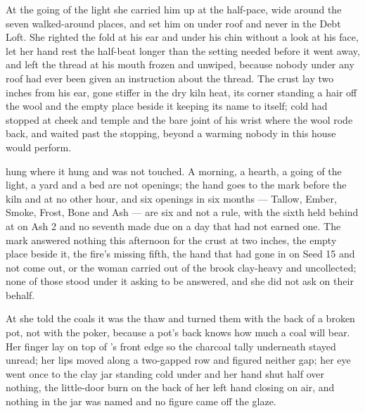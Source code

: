 \scenebreak

At the going of the light she carried him up at the half-pace, wide around the seven walked-around places, and set him on  under  roof and never in the Debt Loft. She righted the fold at his ear and under his chin without a look at his face, let her hand rest the half-beat longer than the setting needed before it went away, and left the thread at his mouth frozen and unwiped, because nobody under any roof had ever been given an instruction about the thread. The crust lay two inches from his ear, gone stiffer in the dry kiln heat, its corner standing a hair off the wool and the empty place beside it keeping its name to itself; cold had stopped at cheek and temple and the bare joint of his wrist where the wool rode back, and  waited past the stopping, beyond a warming nobody in this house would perform.

 hung where it hung and was not touched. A morning, a hearth, a going of the light, a yard and a bed are not openings; the hand goes to the mark before the kiln and at no other hour, and six openings in six months --- Tallow, Ember, Smoke, Frost, Bone and Ash --- are six and not a rule, with the sixth held behind at  on Ash 2 and no seventh made due on a day that had not earned one. The mark answered nothing this afternoon for the crust at two inches, the empty place beside it, the fire's missing fifth, the hand that had gone in on Seed 15 and not come out, or the woman carried out of the brook clay-heavy and uncollected; none of those stood under it asking to be answered, and she did not ask on their behalf.

At  she told the coals it was the thaw and turned them with the back of a broken pot, not with the poker, because a pot's back knows how much a coal will bear. Her finger lay on top of 's front edge so the charcoal tally underneath stayed unread; her lips moved along a two-gapped row and figured neither gap; her eye went once to the clay jar standing cold under  and her hand shut half over nothing, the little-door burn on the back of her left hand closing on air, and nothing in the jar was named and no figure came off the glaze.

